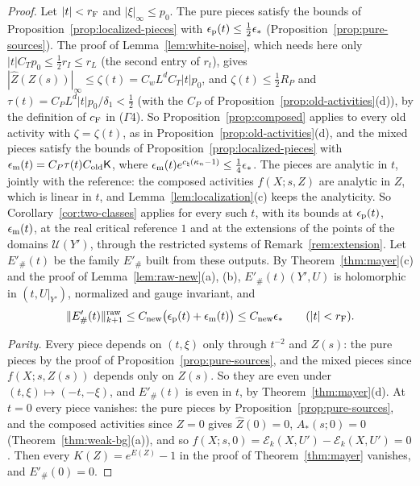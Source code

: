 \begin{proof}
Let $|t|<r_{\rm F}$ and $|\xi|_\infty\le p_0$. The pure pieces satisfy the bounds of Proposition~\ref{prop:localized-pieces} with $\epsilon_{\rm p}(t)\le\frac12\epsilon_*$ (Proposition~\ref{prop:pure-sources}). The proof of Lemma~\ref{lem:white-noise}, which needs here only $|t|C_Tp_0\le\frac12r_I\le r_L$ (the second entry of $r_t$), gives $|\hat Z(Z(s))|_\infty\le\zeta(t)=C_wL^dC_T|t|p_0$, and $\zeta(t)\le\frac12R_P$ and $\tau(t)=C_PL^d|t|p_0/\delta_1<\frac12$ (with the $C_P$ of Proposition~\ref{prop:old-activities}(d)), by the definition of $c_{\rm F}$ in ($\Gamma$4). So Proposition~\ref{prop:composed} applies to every old activity with $\zeta=\zeta(t)$, as in Proposition~\ref{prop:old-activities}(d), and the mixed pieces satisfy the bounds of Proposition~\ref{prop:localized-pieces} with $\epsilon_{\rm m}(t)=C_P\tau(t)C_{\rm old}\mathsf K$, where $\epsilon_{\rm m}(t)e^{c_\natural(\kappa_n-1)}\le\frac14\epsilon_*$. The pieces are analytic in $t$, jointly with the reference: the composed activities $f(X;s,Z)$ are analytic in $Z$, which is linear in $t$, and Lemma~\ref{lem:localization}(c) keeps the analyticity. So Corollary~\ref{cor:two-classes} applies for every such $t$, with its bounds at $\epsilon_{\rm p}(t)$, $\epsilon_{\rm m}(t)$, at the real critical reference $1$ and at the extensions of the points of the domains $\mathcal U(Y')$, through the restricted systems of Remark~\ref{rem:extension}. Let $E'_\#(t)$ be the family $E'_\#$ built from these outputs. By Theorem~\ref{thm:mayer}(c) and the proof of Lemma~\ref{lem:raw-new}(a), (b), $E'_\#(t)(Y',U)$ is holomorphic in $(t,U|_{Y'})$, normalized and gauge invariant, and
\[
\|E'_\#(t)\|^{\rm raw}_{k+1}\le C_{\rm new}\big(\epsilon_{\rm p}(t)+\epsilon_{\rm m}(t)\big)\le C_{\rm new}\epsilon_*\qquad(|t|<r_{\rm F}).
\]

\emph{Parity.} Every piece depends on $(t,\xi)$ only through $t^{-2}$ and $Z(s)$: the pure pieces by the proof of Proposition~\ref{prop:pure-sources}, and the mixed pieces since $f(X;s,Z(s))$ depends only on $Z(s)$. So they are even under $(t,\xi)\mapsto(-t,-\xi)$, and $E'_\#(t)$ is even in $t$, by Theorem~\ref{thm:mayer}(d). At $t=0$ every piece vanishes: the pure pieces by Proposition~\ref{prop:pure-sources}, and the composed activities since $Z=0$ gives $\hat Z(0)=0$, $A_*(s;0)=0$ (Theorem~\ref{thm:weak-bg}(a)), and so $f(X;s,0)=\mathcal E_k(X,U')-\mathcal E_k(X,U')=0$. Then every $K(Z)=e^{E(Z)}-1$ in the proof of Theorem~\ref{thm:mayer} vanishes, and $E'_\#(0)=0$.


\end{proof}
